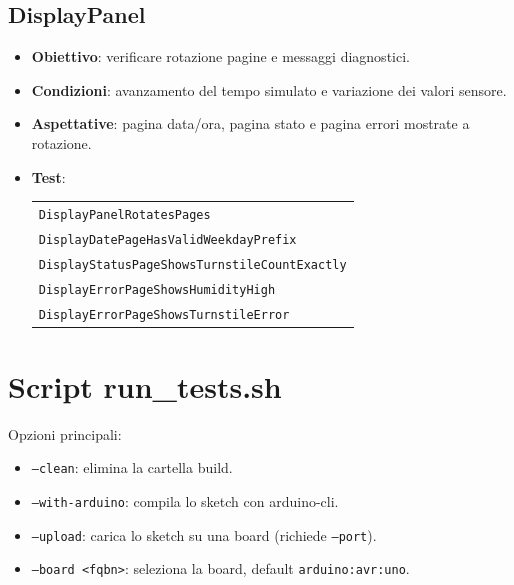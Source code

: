 \subsection{DisplayPanel}
\begin{itemize}
  \item \textbf{Obiettivo}: verificare rotazione pagine e messaggi diagnostici.
  \item \textbf{Condizioni}: avanzamento del tempo simulato e variazione dei valori sensore.
  \item \textbf{Aspettative}: pagina data/ora, pagina stato e pagina errori mostrate a rotazione.
  \item \textbf{Test}:
  \begin{tabular}[t]{@{}l@{}}
    \texttt{DisplayPanelRotatesPages}\\
    \texttt{DisplayDatePageHasValidWeekdayPrefix}\\
    \texttt{DisplayStatusPageShowsTurnstileCountExactly}\\
    \texttt{DisplayErrorPageShowsHumidityHigh}\\
    \texttt{DisplayErrorPageShowsTurnstileError}
  \end{tabular}
\end{itemize}

\section{Script run\_tests.sh}
Opzioni principali:
\begin{itemize}
  \item \texttt{--clean}: elimina la cartella build.
  \item \texttt{--with-arduino}: compila lo sketch con arduino-cli.
  \item \texttt{--upload}: carica lo sketch su una board (richiede \texttt{--port}).
  \item \texttt{--board <fqbn>}: seleziona la board, default \texttt{arduino:avr:uno}.
\end{itemize}
